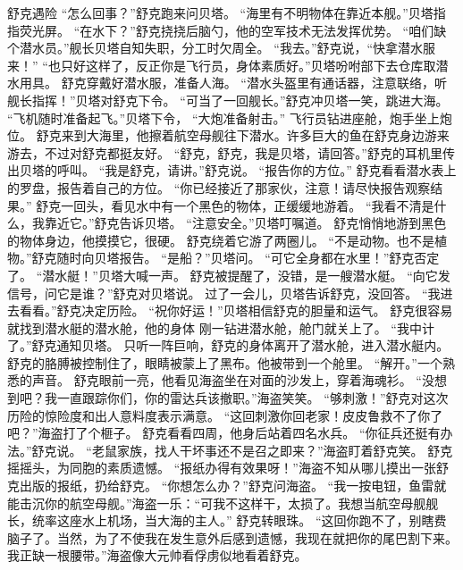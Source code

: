 \documentclass[a4paper,12pt,UTF8,twoside]{ctexbook}
\begin{document}
        舒克遇险   
        “怎么回事？”舒克跑来问贝塔。 
        “海里有不明物体在靠近本舰。”贝塔指指荧光屏。 
        “在水下？”舒克挠挠后脑勺，他的空军技术无法发挥优势。 
        “咱们缺个潜水员。”舰长贝塔自知失职，分工时欠周全。 
        “我去。”舒克说，“快拿潜水服来！” 
        “也只好这样了，反正你是飞行员，身体素质好。”贝塔吩咐部下去仓库取潜水用具。 
        舒克穿戴好潜水服，准备人海。 
        “潜水头盔里有通话器，注意联络，听舰长指挥！”贝塔对舒克下令。 
        “可当了一回舰长。”舒克冲贝塔一笑，跳进大海。 
        “飞机随时准备起飞。”贝塔下令，  “大炮准备射击。” 
        飞行员钻进座舱，炮手坐上炮位。 
        舒克来到大海里，他擦着航空母舰往下潜水。许多巨大的鱼在舒克身边游来游去，不过对舒克都挺友好。 
        “舒克，舒克，我是贝塔，请回答。”舒克的耳机里传出贝塔的呼叫。 
        “我是舒克，请讲。”舒克说。 
        “报告你的方位。” 
        舒克看看潜水表上的罗盘，报告着自己的方位。 
        “你已经接近了那家伙，注意！请尽快报告观察结果。” 
        舒克一回头，看见水中有一个黑色的物体，正缓缓地游着。 
        “我看不清是什么，我靠近它。”舒克告诉贝塔。 
        “注意安全。”贝塔叮嘱道。 
        舒克悄悄地游到黑色的物体身边，他摸摸它，很硬。 
        舒克绕着它游了两圈儿。 
        “不是动物。也不是植物。”舒克随时向贝塔报告。 
        “是船？”贝塔问。 
        “可它全身都在水里！”舒克否定了。 
        “潜水艇！”贝塔大喊一声。 
        舒克被提醒了，没错，是一艘潜水艇。 
        “向它发信号，问它是谁？”舒克对贝塔说。 
        过了一会儿，贝塔告诉舒克，没回答。 
        “我进去看看。”舒克决定历险。 
        “祝你好运！”贝塔相信舒克的胆量和运气。 
        舒克很容易就找到潜水艇的潜水舱，他的身体 
        刚一钻进潜水舱，舱门就关上了。 
        “我中计了。”舒克通知贝塔。 
        只听一阵巨响，舒克的身体离开了潜水舱，进入潜水艇内。 
        舒克的胳膊被控制住了，眼睛被蒙上了黑布。他被带到一个舱里。 
        “解开。”一个熟悉的声音。 
        舒克眼前一亮，他看见海盗坐在对面的沙发上，穿着海魂衫。 
        “没想到吧？我一直跟踪你们，你的雷达兵该撤职。”海盗笑笑。 
        “够刺激！”舒克对这次历险的惊险度和出人意料度表示满意。 
        “这回刺激你回老家！皮皮鲁救不了你了吧？”海盗打了个榧子。 
        舒克看看四周，他身后站着四名水兵。 
        “你征兵还挺有办法。”舒克说。 
        “老鼠家族，找人干坏事还不是召之即来？”海盗盯着舒克笑。 
        舒克摇摇头，为同胞的素质遗憾。 
        “报纸办得有效果呀！”海盗不知从哪儿摸出一张舒克出版的报纸，扔给舒克。 
        “你想怎么办？”舒克问海盗。 
        “我一按电钮，鱼雷就能击沉你的航空母舰。”海盗一乐：“可我不这样干，太损了。我想当航空母舰舰长，统率这座水上机场，当大海的主人。” 
        舒克转眼珠。 
        “这回你跑不了，别瞎费脑子了。当然，为了不使我在发生意外后感到遗憾，我现在就把你的尾巴割下来。我正缺一根腰带。”海盗像大元帅看俘虏似地看着舒克。 
\end{document}
